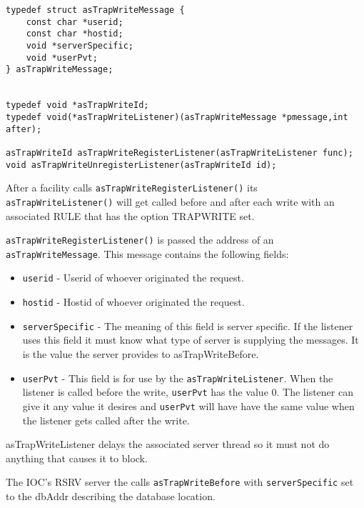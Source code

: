 \begin{verbatim}
typedef struct asTrapWriteMessage {
    const char *userid;
    const char *hostid;
    void *serverSpecific;
    void *userPvt;
} asTrapWriteMessage;


typedef void *asTrapWriteId;
typedef void(*asTrapWriteListener)(asTrapWriteMessage *pmessage,int after);

asTrapWriteId asTrapWriteRegisterListener(asTrapWriteListener func);
void asTrapWriteUnregisterListener(asTrapWriteId id);
\end{verbatim}

After a facility calls \verb|asTrapWriteRegisterListener()| its \verb|asTrapWriteListener()| will get called before 
and after each write with an associated RULE that has the option TRAPWRITE  set.

\verb|asTrapWriteRegisterListener()| is passed the address of an \verb|asTrapWriteMessage|. This message contains 
the following fields:

\begin{itemize}
\item  \verb|userid| - Userid of whoever originated the request.

\item  \verb|hostid| - Hostid of whoever originated the request.

\item \verb|serverSpecific| - The meaning of this field is server specific. If the listener uses this field it must know what 
type of server is supplying the messages. It is the value the server provides to asTrapWriteBefore.

\item \verb|userPvt| - This field is for use by the \verb|asTrapWriteListener|. When the listener is called before the write,  
\verb|userPvt| has the value 0. The listener can give it any value it desires and \verb|userPvt| will have have the same 
value when the listener gets called after the write.
\end{itemize}

asTrapWriteListener delays the associated server thread so it must not do anything that causes it to block.

The IOC's RSRV server the calls  \verb|asTrapWriteBefore| with \verb|serverSpecific|  set to the dbAddr describing the 
database location.

